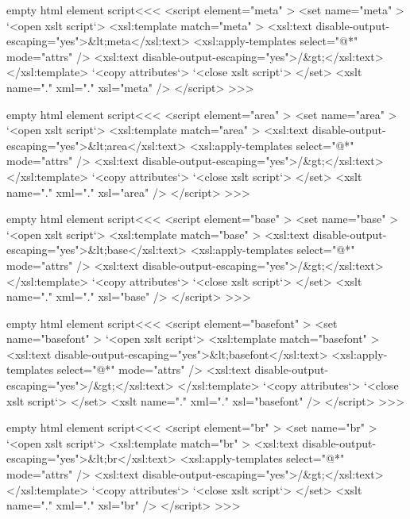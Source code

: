 \documentclass{article}
\begin{document}
{{{\<empty html element script\><<<
<script element="meta" >
   <set name="meta" >
      `<open xslt script`>
      <xsl:template match="meta" >
         <xsl:text disable-output-escaping="yes">&lt;meta</xsl:text>
             <xsl:apply-templates select="@*" mode="attrs" />
         <xsl:text disable-output-escaping="yes">/&gt;</xsl:text>
      </xsl:template> 
      `<copy attributes`>
      `<close xslt script`>
   </set>
   <xslt name="." xml="." xsl="meta" />
</script> 
>>>


\<empty html element script\><<< 
<script element="area" > 
   <set name="area" > 
      `<open xslt script`> 
      <xsl:template match="area" > 
         <xsl:text disable-output-escaping="yes">&lt;area</xsl:text> 
             <xsl:apply-templates select="@*" mode="attrs" /> 
         <xsl:text disable-output-escaping="yes">/&gt;</xsl:text> 
      </xsl:template>  
      `<copy attributes`> 
      `<close xslt script`> 
   </set> 
   <xslt name="." xml="." xsl="area" /> 
</script>  
>>> 




\<empty html element script\><<< 
<script element="base" > 
   <set name="base" > 
      `<open xslt script`> 
      <xsl:template match="base" > 
         <xsl:text disable-output-escaping="yes">&lt;base</xsl:text> 
             <xsl:apply-templates select="@*" mode="attrs" /> 
         <xsl:text disable-output-escaping="yes">/&gt;</xsl:text> 
      </xsl:template>  
      `<copy attributes`> 
      `<close xslt script`> 
   </set> 
   <xslt name="." xml="." xsl="base" /> 
</script>  
>>> 




 \<empty html element script\><<< 
<script element="basefont" > 
   <set name="basefont" > 
      `<open xslt script`> 
      <xsl:template match="basefont" > 
         <xsl:text disable-output-escaping="yes">&lt;basefont</xsl:text> 
             <xsl:apply-templates select="@*" mode="attrs" /> 
         <xsl:text disable-output-escaping="yes">/&gt;</xsl:text> 
      </xsl:template>  
      `<copy attributes`> 
      `<close xslt script`> 
   </set> 
   <xslt name="." xml="." xsl="basefont" /> 
</script>  
>>> 




 \<empty html element script\><<< 
<script element="br" > 
   <set name="br" > 
      `<open xslt script`> 
      <xsl:template match="br" > 
         <xsl:text disable-output-escaping="yes">&lt;br</xsl:text> 
             <xsl:apply-templates select="@*" mode="attrs" /> 
         <xsl:text disable-output-escaping="yes">/&gt;</xsl:text> 
      </xsl:template>  
      `<copy attributes`> 
      `<close xslt script`> 
   </set> 
   <xslt name="." xml="." xsl="br" /> 
</script>  
>>> 




}}}
\end{document}
